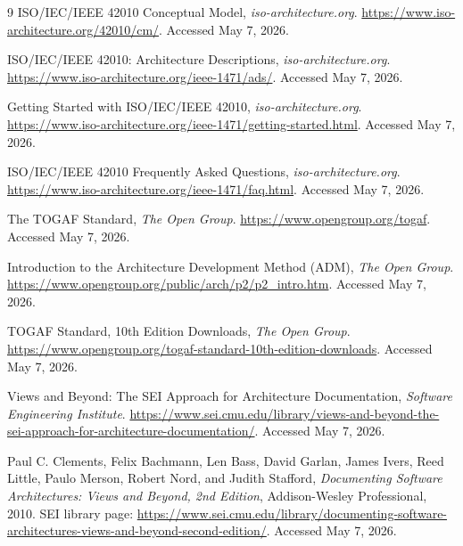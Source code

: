 \documentclass[11pt]{article}
\begin{document}
\begin{thebibliography}{9}
ISO/IEC/IEEE 42010 Conceptual Model, \emph{iso-architecture.org}. \url{https://www.iso-architecture.org/42010/cm/}. Accessed May 7, 2026.

ISO/IEC/IEEE 42010: Architecture Descriptions, \emph{iso-architecture.org}. \url{https://www.iso-architecture.org/ieee-1471/ads/}. Accessed May 7, 2026.

Getting Started with ISO/IEC/IEEE 42010, \emph{iso-architecture.org}. \url{https://www.iso-architecture.org/ieee-1471/getting-started.html}. Accessed May 7, 2026.

ISO/IEC/IEEE 42010 Frequently Asked Questions, \emph{iso-architecture.org}. \url{https://www.iso-architecture.org/ieee-1471/faq.html}. Accessed May 7, 2026.

The TOGAF Standard, \emph{The Open Group}. \url{https://www.opengroup.org/togaf}. Accessed May 7, 2026.

Introduction to the Architecture Development Method (ADM), \emph{The Open Group}. \url{https://www.opengroup.org/public/arch/p2/p2_intro.htm}. Accessed May 7, 2026.

TOGAF Standard, 10th Edition Downloads, \emph{The Open Group}. \url{https://www.opengroup.org/togaf-standard-10th-edition-downloads}. Accessed May 7, 2026.

Views and Beyond: The SEI Approach for Architecture Documentation, \emph{Software Engineering Institute}. \url{https://www.sei.cmu.edu/library/views-and-beyond-the-sei-approach-for-architecture-documentation/}. Accessed May 7, 2026.

Paul C. Clements, Felix Bachmann, Len Bass, David Garlan, James Ivers, Reed Little, Paulo Merson, Robert Nord, and Judith Stafford, \emph{Documenting Software Architectures: Views and Beyond, 2nd Edition}, Addison-Wesley Professional, 2010. SEI library page: \url{https://www.sei.cmu.edu/library/documenting-software-architectures-views-and-beyond-second-edition/}. Accessed May 7, 2026.
\end{thebibliography}
\end{document}
